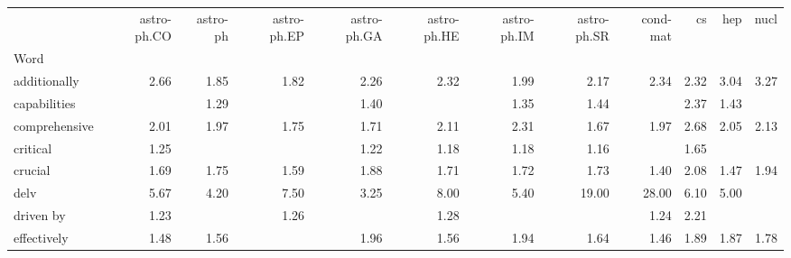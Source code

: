 \begin{tabular}{lrrrrrrrrrrr}
\toprule
 & astro-ph.CO & astro-ph & astro-ph.EP & astro-ph.GA & astro-ph.HE & astro-ph.IM & astro-ph.SR & cond-mat & cs & hep & nucl \\
Word &  &  &  &  &  &  &  &  &  &  &  \\
\midrule
additionally & \cellcolor{blue!53} 2.66 & \cellcolor{blue!37} 1.85 & \cellcolor{blue!36} 1.82 & \cellcolor{blue!45} 2.26 & \cellcolor{blue!46} 2.32 & \cellcolor{blue!39} 1.99 & \cellcolor{blue!43} 2.17 & \cellcolor{blue!46} 2.34 & \cellcolor{blue!46} 2.32 & \cellcolor{blue!60} 3.04 & \cellcolor{blue!65} 3.27 \\
capabilities &  & \cellcolor{blue!25} 1.29 &  & \cellcolor{blue!27} 1.40 &  & \cellcolor{blue!27} 1.35 & \cellcolor{blue!28} 1.44 &  & \cellcolor{blue!47} 2.37 & \cellcolor{blue!28} 1.43 &  \\
comprehensive & \cellcolor{blue!40} 2.01 & \cellcolor{blue!39} 1.97 & \cellcolor{blue!35} 1.75 & \cellcolor{blue!34} 1.71 & \cellcolor{blue!42} 2.11 & \cellcolor{blue!46} 2.31 & \cellcolor{blue!33} 1.67 & \cellcolor{blue!39} 1.97 & \cellcolor{blue!53} 2.68 & \cellcolor{blue!41} 2.05 & \cellcolor{blue!42} 2.13 \\
critical & \cellcolor{blue!25} 1.25 &  &  & \cellcolor{blue!24} 1.22 & \cellcolor{blue!23} 1.18 & \cellcolor{blue!23} 1.18 & \cellcolor{blue!23} 1.16 &  & \cellcolor{blue!32} 1.65 &  &  \\
crucial & \cellcolor{blue!33} 1.69 & \cellcolor{blue!35} 1.75 & \cellcolor{blue!31} 1.59 & \cellcolor{blue!37} 1.88 & \cellcolor{blue!34} 1.71 & \cellcolor{blue!34} 1.72 & \cellcolor{blue!34} 1.73 & \cellcolor{blue!27} 1.40 & \cellcolor{blue!41} 2.08 & \cellcolor{blue!29} 1.47 & \cellcolor{blue!38} 1.94 \\
delv & \cellcolor{blue!100} 5.67 & \cellcolor{blue!84} 4.20 & \cellcolor{blue!100} 7.50 & \cellcolor{blue!65} 3.25 & \cellcolor{blue!100} 8.00 & \cellcolor{blue!100} 5.40 & \cellcolor{blue!100} 19.00 & \cellcolor{blue!100} 28.00 & \cellcolor{blue!100} 6.10 & \cellcolor{blue!100} 5.00 &  \\
driven by & \cellcolor{blue!24} 1.23 &  & \cellcolor{blue!25} 1.26 &  & \cellcolor{blue!25} 1.28 &  &  & \cellcolor{blue!24} 1.24 & \cellcolor{blue!44} 2.21 &  &  \\
effectively & \cellcolor{blue!29} 1.48 & \cellcolor{blue!31} 1.56 &  & \cellcolor{blue!39} 1.96 & \cellcolor{blue!31} 1.56 & \cellcolor{blue!38} 1.94 & \cellcolor{blue!32} 1.64 & \cellcolor{blue!29} 1.46 & \cellcolor{blue!37} 1.89 & \cellcolor{blue!37} 1.87 & \cellcolor{blue!35} 1.78 \\

\end{tabular}
